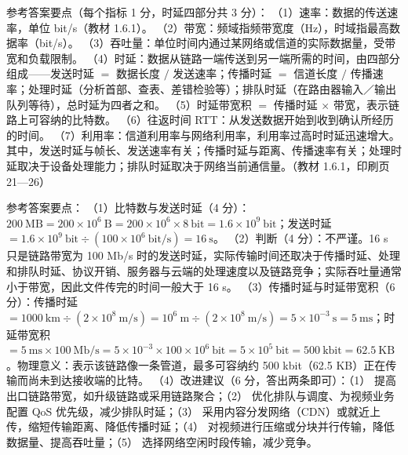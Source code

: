 \documentclass[a4paper,11pt]{article}
\begin{document}
\q 参考答案要点（每个指标 1 分，时延四部分共 3 分）：
（1）速率：数据的传送速率，单位 bit/s（教材 1.6.1）。
（2）带宽：频域指频带宽度（Hz），时域指最高数据率（bit/s）。
（3）吞吐量：单位时间内通过某网络或信道的实际数据量，受带宽和负载限制。
（4）时延：数据从链路一端传送到另一端所需的时间，由四部分组成——发送时延 $=$ 数据长度 $/$ 发送速率；传播时延 $=$ 信道长度 $/$ 传播速率；处理时延（分析首部、查表、差错检验等）；排队时延（在路由器输入／输出队列等待），总时延为四者之和。
（5）时延带宽积 $=$ 传播时延 $\times$ 带宽，表示链路上可容纳的比特数。
（6）往返时间 RTT：从发送数据开始到收到确认所经历的时间。
（7）利用率：信道利用率与网络利用率，利用率过高时时延迅速增大。
其中，发送时延与帧长、发送速率有关；传播时延与距离、传播速率有关；处理时延取决于设备处理能力；排队时延取决于网络当前通信量。（教材 1.6.1，印刷页 21—26）


\q 参考答案要点：
（1）比特数与发送时延（4 分）：$200\ \text{MB}=200\times10^{6}\ \text{B}=200\times10^{6}\times8\ \text{bit}=1.6\times10^{9}\ \text{bit}$；发送时延 $=1.6\times10^{9}\ \text{bit}\div(100\times10^{6}\ \text{bit/s})=16\ \text{s}$。
（2）判断（4 分）：不严谨。16 s 只是链路带宽为 100 Mb/s 时的发送时延，实际传输时间还取决于传播时延、处理和排队时延、协议开销、服务器与云端的处理速度以及链路竞争；实际吞吐量通常小于带宽，因此文件传完的时间一般大于 16 s。
（3）传播时延与时延带宽积（6 分）：传播时延 $=1000\ \text{km}\div(2\times10^{8}\ \text{m/s})=10^{6}\ \text{m}\div(2\times10^{8}\ \text{m/s})=5\times10^{-3}\ \text{s}=5\ \text{ms}$；时延带宽积 $=5\ \text{ms}\times100\ \text{Mb/s}=5\times10^{-3}\times100\times10^{6}\ \text{bit}=5\times10^{5}\ \text{bit}=500\ \text{kbit}=62.5\ \text{KB}$。物理意义：表示该链路像一条管道，最多可容纳约 500 kbit（62.5 KB）正在传输而尚未到达接收端的比特。
（4）改进建议（6 分，答出两条即可）：（1） 提高出口链路带宽，如升级链路或采用链路聚合；（2） 优化排队与调度、为视频业务配置 QoS 优先级，减少排队时延；（3） 采用内容分发网络（CDN）或就近上传，缩短传输距离、降低传播时延；（4） 对视频进行压缩或分块并行传输，降低数据量、提高吞吐量；（5） 选择网络空闲时段传输，减少竞争。
\end{document}
